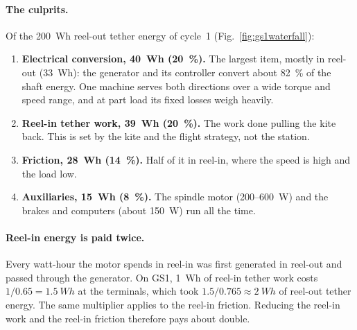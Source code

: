 \documentclass[11pt,a4paper]{article}
\begin{document}
\paragraph{The culprits.} Of the \SI{200}{Wh} reel-out tether energy of
cycle~1 (Fig.~\ref{fig:gs1waterfall}):
\begin{enumerate}
  \item \textbf{Electrical conversion, \SI{40}{Wh} (\SI{20}{\percent}).} The
    largest item, mostly in reel-out (\SI{33}{Wh}): the generator and its
    controller convert about \SI{82}{\percent} of the shaft energy. One machine
    serves both directions over a wide torque and speed range, and at part load
    its fixed losses weigh heavily.
  \item \textbf{Reel-in tether work, \SI{39}{Wh} (\SI{20}{\percent}).} The
    work done pulling the kite back. This is set by the kite and the flight
    strategy, not the station.
  \item \textbf{Friction, \SI{28}{Wh} (\SI{14}{\percent}).} Half of it in
    reel-in, where the speed is high and the load low.
  \item \textbf{Auxiliaries, \SI{15}{Wh} (\SI{8}{\percent}).} The spindle
    motor (200--\SI{600}{W}) and the brakes and computers (about \SI{150}{W})
    run all the time.
\end{enumerate}

\paragraph{Reel-in energy is paid twice.} Every watt-hour the motor spends in
reel-in was first generated in reel-out and passed through the generator. On
GS1, \SI{1}{Wh} of reel-in tether work costs $1/0.65 = \SI{1.5}{Wh}$ at the
terminals, which took $1.5/0.765 \approx \SI{2}{Wh}$ of reel-out tether energy.
The same multiplier applies to the reel-in friction. Reducing the reel-in work
and the reel-in friction therefore pays about double.
\end{document}
